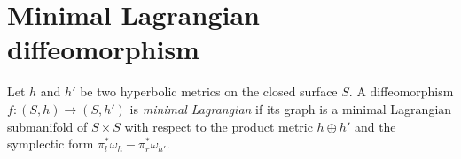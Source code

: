 \section{Minimal Lagrangian diffeomorphism}

\begin{definition}
    Let $h$ and $h'$ be two hyperbolic metrics on the closed surface $S$. A diffeomorphism $f: (S,h) \to (S,h')$ is \textit{minimal Lagrangian} if its graph is a minimal Lagrangian submanifold of $S\times S$ with respect to the product metric $h \oplus h'$ and the symplectic form $\pi_l^*\omega_h - \pi_r^* \omega_{h'}$. 
\end{definition}

